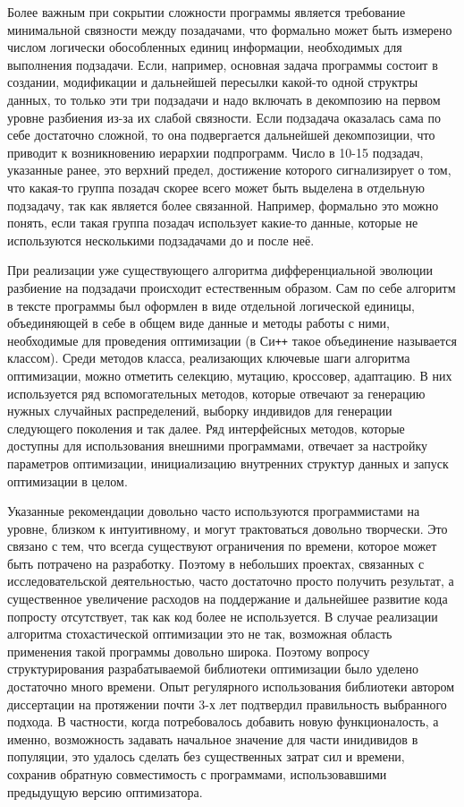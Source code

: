 Более важным при сокрытии сложности программы является требование
минимальной связности между позадачами, что формально может быть
измерено числом логически обособленных единиц информации, необходимых
для выполнения подзадачи. Если, например, основная задача программы
состоит в создании, модификации и дальнейшей пересылки какой-то одной
структры данных, то только эти три подзадачи и надо включать в
декомпозию на первом уровне разбиения из-за их слабой связности. Если
подзадача оказалась сама по себе достаточно сложной, то она
подвергается дальнейшей декомпозиции, что приводит к возникновению
иерархии подпрограмм.  Число в 10-15 подзадач, указанные ранее, это
верхний предел, достижение которого сигнализирует о том, что какая-то
группа позадач скорее всего может быть выделена в отдельную подзадачу,
так как является более связанной. Например, формально это можно
понять, если такая группа позадач использует какие-то данные, которые
не используются несколькими подзадачами до и после неё.

При реализации уже существующего алгоритма дифференциальной эволюции
разбиение на подзадачи происходит естественным образом. Сам по себе
алгоритм в тексте программы был оформлен в виде отдельной логической
единицы, объединяющей в себе в общем виде данные и методы работы с
ними, необходимые для проведения оптимизации (в Си\texttt{++} такое
объединение называется классом). Среди методов класса, реализающих
ключевые шаги алгоритма оптимизации, можно отметить селекцию, мутацию,
кроссовер, адаптацию. В них используется ряд вспомогательных методов,
которые отвечают за генерацию нужных случайных распределений, выборку
индивидов для генерации следующего поколения и так далее. Ряд
интерфейсных методов, которые доступны для использования внешними
программами, отвечает за настройку параметров оптимизации,
инициализацию внутренних структур данных и запуск оптимизации в целом.

Указанные рекомендации довольно часто используются программистами на
уровне, близком к интуитивному, и могут трактоваться довольно
творчески.  Это связано с тем, что всегда существуют ограничения по
времени, которое может быть потрачено на разработку. Поэтому в
небольших проектах, связанных с исследовательской деятельностью, часто
достаточно просто получить результат, а существенное увеличение
расходов на поддержание и дальнейшее развитие кода попросту
отсутствует, так как код более не используется. В случае реализации
алгоритма стохастической оптимизации это не так, возможная область
применения такой программы довольно широка. Поэтому вопросу
структурирования разрабатываемой библиотеки оптимизации было уделено
достаточно много времени.  Опыт регулярного использования библиотеки
автором диссертации на протяжении почти 3-х лет подтвердил
правильность выбранного подхода.  В частности, когда потребовалось
добавить новую функционалость, а именно, возможность задавать
начальное значение для части инидивидов в популяции, это удалось
сделать без существенных затрат сил и времени, сохранив обратную
совместимость с программами, использовавшими предыдущую версию
оптимизатора.

